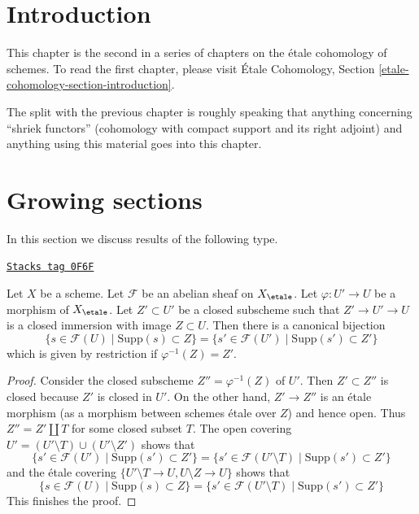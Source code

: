 \section{Introduction}
\label{more-etale-section-introduction}
This chapter is the second in a series of chapters on the \'etale cohomology
of schemes. To read the first chapter, please visit
\'Etale Cohomology, Section \ref{etale-cohomology-section-introduction}.

\medskip\noindent
The split with the previous chapter is roughly speaking that anything
concerning ``shriek functors'' (cohomology with compact support and
its right adjoint) and anything using this material goes into this chapter.

\section{Growing sections}
\label{more-etale-section-growing}
In this section we discuss results of the following type.

\begin{lemma}
\label{more-etale-lemma-section-support-in-locally-closed-pre}
\href{https://stacks.math.columbia.edu/tag/0F6F}{\texttt{Stacks tag 0F6F}}

Let $X$ be a scheme. Let $\mathcal{F}$ be an abelian sheaf on $X_\etale$.
Let $\varphi : U' \to U$ be a morphism of $X_\etale$. Let $Z' \subset U'$ be a
closed subscheme such that $Z' \to U' \to U$ is a closed immersion
with image $Z \subset U$. Then there is a canonical bijection
$$
\{s \in \mathcal{F}(U) \mid \text{Supp}(s) \subset Z\} =
\{s' \in \mathcal{F}(U') \mid \text{Supp}(s') \subset Z'\}
$$
which is given by restriction if $\varphi^{-1}(Z) = Z'$.
\end{lemma}

\begin{proof}
Consider the closed subscheme $Z'' = \varphi^{-1}(Z)$ of $U'$.
Then $Z' \subset Z''$ is closed because $Z'$ is closed in $U'$.
On the other hand, $Z' \to Z''$ is an \'etale morphism
(as a morphism between schemes \'etale over $Z$) and hence
open. Thus $Z'' = Z' \amalg T$ for some closed subset $T$.
The open covering $U' = (U' \setminus T) \cup (U' \setminus Z')$
shows that
$$
\{s' \in \mathcal{F}(U') \mid \text{Supp}(s') \subset Z'\} =
\{s' \in \mathcal{F}(U' \setminus T) \mid \text{Supp}(s') \subset Z'\}
$$
and the \'etale covering $\{U' \setminus T \to U, U \setminus Z \to U\}$
shows that
$$
\{s \in \mathcal{F}(U) \mid \text{Supp}(s) \subset Z\} =
\{s' \in \mathcal{F}(U' \setminus T) \mid \text{Supp}(s') \subset Z'\}
$$
This finishes the proof.
\end{proof}

